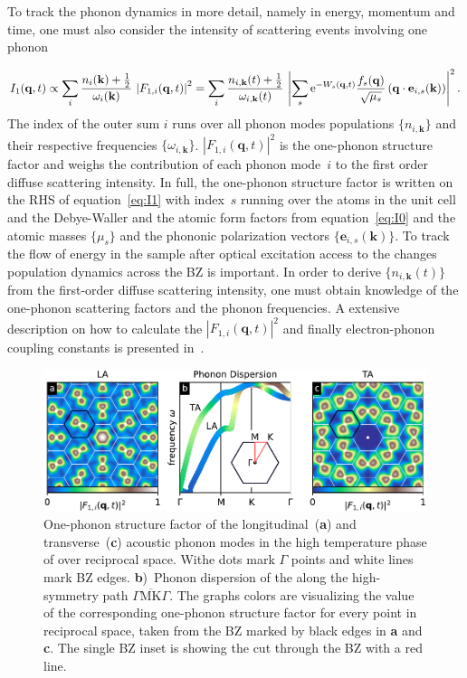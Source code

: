 To track the phonon dynamics in more detail, namely in energy, momentum and time, one must also consider the intensity of scattering events involving one phonon

\begin{equation} I_1(\mathbf{q},t) \propto \sum_i \frac{n_i(\mathbf{k})+\frac{1}{2}}{\omega_i(\mathbf{k})}\,\left| F_{1,i}(\mathbf{q},t) \right|^2 = \sum_i \frac{n_{i,\mathbf{k}}(t)+\frac{1}{2}}{\omega_{i,\mathbf{k}}(t)}\,\left| \sum_s \mathrm{e}^{-W_s(\mathbf{q},t)} \frac{f_s(\mathbf{q})}{\sqrt{\mu_s}} \left( \mathbf{q}\cdot\mathbf{e}_{i, s}(\mathbf{k}) \right) \right|^2.\label{eq:I1}\end{equation}
The index of the outer sum $i$ runs over all phonon modes populations $\{n_{i,\mathbf{k}}\}$ and their respective frequencies $\{\omega_{i,\mathbf{k}}\}$.
$\left| F_{1,i}(\mathbf{q},t) \right|^2$ is the one-phonon structure factor and weighs the contribution of each phonon mode~$i$ to the first order diffuse scattering intensity.
In full, the one-phonon structure factor is written on the RHS of equation~\ref{eq:I1} with index~$s$ running over the atoms in the unit cell and the Debye-Waller and the atomic form factors from equation~\ref{eq:I0} and the atomic masses $\{\mu_s\}$ and the phononic polarization vectors $\{\mathbf{e}_{i, s}(\mathbf{k})\}$.
To track the flow of energy in the sample after optical excitation access to the changes population dynamics across the \ac{BZ} is important.
In order to derive $\{n_{i,\mathbf{k}}(t)\}$ from the first-order diffuse scattering intensity, one must obtain knowledge of the one-phonon scattering factors and the phonon frequencies.
A extensive description on how to calculate the $\left| F_{1,i}(\mathbf{q},t) \right|^2$ and finally electron-phonon coupling constants is presented in~\cite{stern2018,renedecotret2019}.

\begin{figure}[!t]
	\includegraphics[width=\columnwidth]{figs/ops.pdf}
	\caption{One-phonon structure factor of the longitudinal~(\textbf{a}) and transverse~(\textbf{c}) acoustic phonon modes in the high temperature phase of \ts over reciprocal space. Withe dots mark $\Gamma$ points and white lines mark \ac{BZ} edges. \textbf{b})~Phonon dispersion of the along the high-symmetry path $\overline{\Gamma\mathrm{MK}\Gamma}$. The graphs colors are visualizing the value of the corresponding one-phonon structure factor for every point in reciprocal space, taken from the \ac{BZ} marked by black edges in \textbf{a} and \textbf{c}. The single \ac{BZ} inset is showing the cut through the \ac{BZ} with a red line.}
	\label{fig:ops}
\end{figure}

